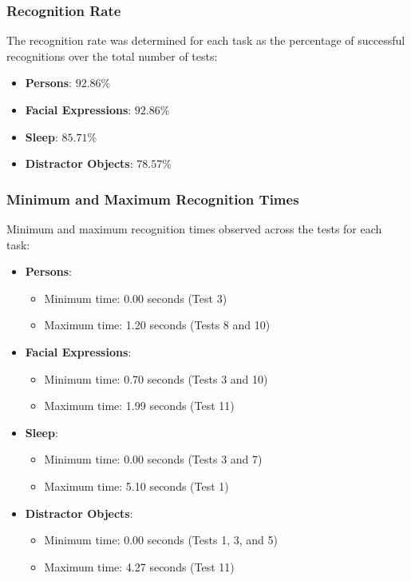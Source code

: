 \documentclass[a4paper,fleqn]{cas-sc}
\begin{document}
			\subsubsection{Recognition Rate}
				The recognition rate was determined for each task as the percentage of successful recognitions over the total number of tests:
				
				\begin{itemize}
					\item \textbf{Persons}: \(92.86\%\)
					\item \textbf{Facial Expressions}: \(92.86\%\)
					\item \textbf{Sleep}: \(85.71\%\)
					\item \textbf{Distractor Objects}: \(78.57\%\)
				\end{itemize}

			\subsubsection{Minimum and Maximum Recognition Times}
				Minimum and maximum recognition times observed across the tests for each task:
				
				\begin{itemize}
					\item \textbf{Persons}:
					\begin{itemize}
						\item Minimum time: 0.00 seconds (Test 3)
						\item Maximum time: 1.20 seconds (Tests 8 and 10)
					\end{itemize}
					\item \textbf{Facial Expressions}:
					\begin{itemize}
						\item Minimum time: 0.70 seconds (Tests 3 and 10)
						\item Maximum time: 1.99 seconds (Test 11)
					\end{itemize}
					\item \textbf{Sleep}:
					\begin{itemize}
						\item Minimum time: 0.00 seconds (Tests 3 and 7)
						\item Maximum time: 5.10 seconds (Test 1)
					\end{itemize}
					\item \textbf{Distractor Objects}:
					\begin{itemize}
						\item Minimum time: 0.00 seconds (Tests 1, 3, and 5)
						\item Maximum time: 4.27 seconds (Test 11)
					\end{itemize}
				\end{itemize}
\end{document}
